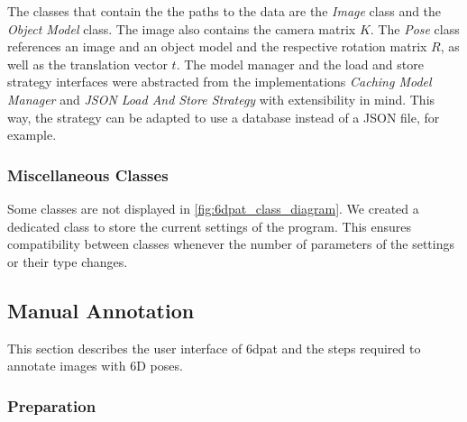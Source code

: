 The classes that contain the the paths to the data are the \textit{Image} class and the \textit{Object Model} class. The image also contains the camera matrix $K$. The \textit{Pose} class references an image and an object model and the respective rotation matrix $R$, as well as the translation vector $t$. The model manager and the load and store strategy interfaces were abstracted from the implementations \textit{Caching Model Manager} and \textit{JSON Load And Store Strategy} with extensibility in mind. This way, the strategy can be adapted to use a database instead of a JSON file, for example.

\subsubsection{Miscellaneous Classes}

Some classes are not displayed in \fig \ref{fig:6dpat_class_diagram}. We created a dedicated class to store the current settings of the program. This ensures compatibility between classes whenever the number of parameters of the settings or their type changes.

\subsection{Manual Annotation} 

This section describes the user interface of \ac{6dpat} and the steps required to annotate images with 6D poses. 

\subsubsection{Preparation}

